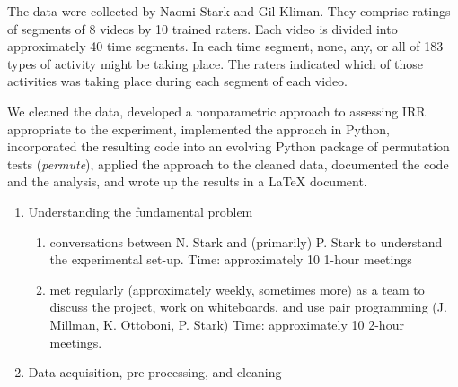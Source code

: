 \documentclass[]{article}
\begin{document}
The data were collected by Naomi Stark and Gil Kliman. They
comprise ratings of segments of 8 videos by 10 trained raters. Each
video is divided into approximately 40 time segments. In each time
segment, none, any, or all of 183 types of activity might be taking
place. The raters indicated which of those activities was taking place
during each segment of each video.

We cleaned the data, developed a nonparametric approach to assessing IRR
appropriate to the experiment, implemented the approach in Python,
incorporated the resulting code into an evolving Python package of
permutation tests (\emph{permute}), applied the approach to the cleaned
data, documented the code and the analysis, and wrote up the results in
a LaTeX document. 

\begin{enumerate}
\def\labelenumi{\arabic{enumi}.}
\itemsep1pt\parskip0pt
\item
  Understanding the fundamental problem

  \begin{enumerate}
  \def\labelenumii{\roman{enumii}.}
  \itemsep1pt\parskip0pt
  \item
    conversations between N. Stark and (primarily) P. Stark to
    understand the experimental set-up. Time: approximately 10 1-hour
    meetings
  \item
    met regularly (approximately weekly, sometimes more) as a team to
    discuss the project, work on whiteboards, and use pair programming
    (J. Millman, K. Ottoboni, P. Stark) Time: approximately 10 2-hour
    meetings.
  \end{enumerate}
\item
  Data acquisition, pre-processing, and cleaning


\end{enumerate}
\end{document}

